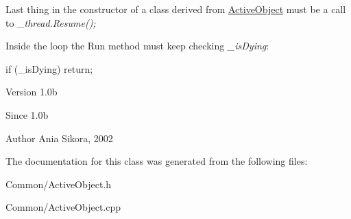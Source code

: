 Last thing in the constructor of a class derived from \hyperlink{class_common_1_1_active_object}{Active\-Object} must be a call to {\itshape \-\_\-thread.\-Resume();}\par
 Inside the loop the Run method must keep checking {\itshape \-\_\-is\-Dying}\-: 
\begin{DoxyCode}
\textcolor{keywordflow}{if} (\_isDying)
    \textcolor{keywordflow}{return};
\end{DoxyCode}


\begin{DoxyVersion}{Version}
1.\-0b 
\end{DoxyVersion}
\begin{DoxySince}{Since}
1.\-0b 
\end{DoxySince}
\begin{DoxyAuthor}{Author}
Ania Sikora, 2002 
\end{DoxyAuthor}


The documentation for this class was generated from the following files\-:\begin{DoxyCompactItemize}
\item 
Common/Active\-Object.\-h\item 
Common/Active\-Object.\-cpp\end{DoxyCompactItemize}
